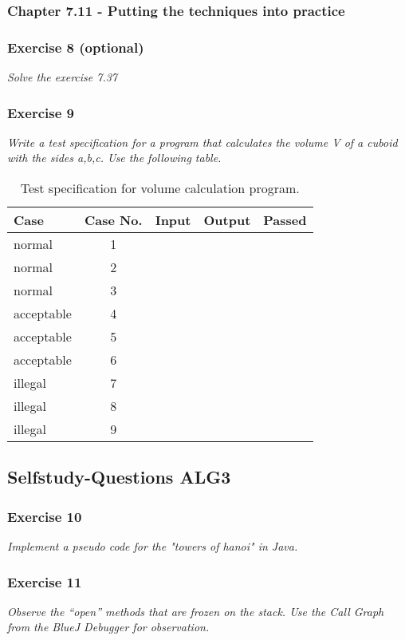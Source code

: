 \subsubsection{Chapter 7.11 - Putting the techniques into practice}

\subsubsection*{Exercise 8 (optional)}
\textit{Solve the exercise 7.37}

\subsubsection*{Exercise 9}
\textit{Write a test specification for a program that calculates the volume V
of a cuboid with the sides a,b,c. Use the following table.}

\begin{table}[h!]
	\centering
	\begin{tabular}{l c p{4cm} p{4cm} c}
	Case & Case No. & Input & Output & Passed \\
	\hline
	normal 		& 1 & & & \\
	normal 		& 2 & & & \\
	normal 		& 3 & & & \\
	acceptable 	& 4 & & & \\
	acceptable 	& 5 & & & \\
	acceptable 	& 6 & & & \\
	illegal 	& 7 & & & \\
	illegal 	& 8 & & & \\
	illegal 	& 9 & & & \\
	\end{tabular}
	\caption{Test specification for volume calculation program.}
	\label{table:test-specification}
\end{table}


\subsection{Selfstudy-Questions ALG3}

\subsubsection*{Exercise 10}
\textit{Implement a pseudo code for the "towers of hanoi" in Java.} \\

\subsubsection*{Exercise 11}
\textit{Observe the "`open"' methods that are frozen on the stack.
Use the Call Graph from the BlueJ Debugger for observation.} \\
